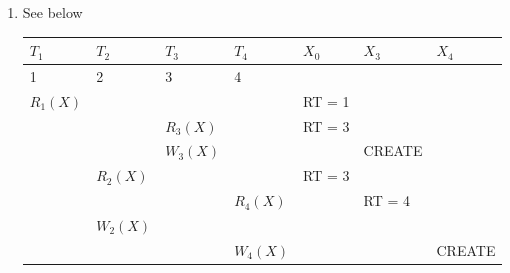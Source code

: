 \documentclass[10pt]{article}
\begin{document}
\begin{enumerate}
		\item See below
            \begin{center}
                \begin{tabularx}{\linewidth}{Y|Y|Y|Y|Y|Y|Y}
                    $T_1$ & $T_2$ & $T_3$ & $T_4$ & $X_0$ & $X_3$ & $X_4$ \\  & 2 & 3 & 4 & & &  \\ \hline
					$R_1(X)$ & & & & RT = 1 & &  \\ \hline
					& & $R_3(X)$  & & RT = 3 & &  \\ \hline
					& & $W_3(X)$  & & & CREATE &  \\ \hline
					& $R_2(X)$ & & & RT = 3& &  \\ \hline
					& & & $R_4(X)$ & & RT = 4 &  \\ \hline
					&  & & & & &  \\ \hline
					& & & $W_4(X)$ & &  & CREATE  \\ \hline
                \end{tabularx}
            \end{center}
	\end{enumerate}
\end{document}

